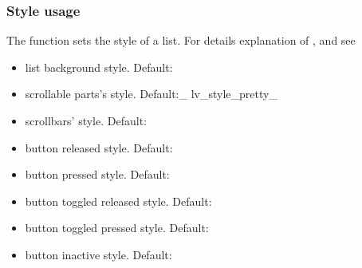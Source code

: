 \documentclass[letterpaper,10pt,english]{sphinxmanual}
\begin{document}
\subsubsection{Style usage}
\label{\detokenize{object-types/list:style-usage}}
The  function sets the style of a list. For details explanation of ,  and  see 
\begin{itemize}
\item {} 
 list background style. Default: 

\item {} 
 scrollable parts’s style. Default:\_ lv\_style\_pretty\_

\item {} 
 scrollbars’ style. Default: 

\item {} 
 button released style. Default: 

\item {} 
 button pressed style. Default: 

\item {} 
 button toggled released style. Default: 

\item {} 
 button toggled pressed style. Default: 

\item {} 
 button inactive style. Default: 

\end{itemize}
\end{document}
